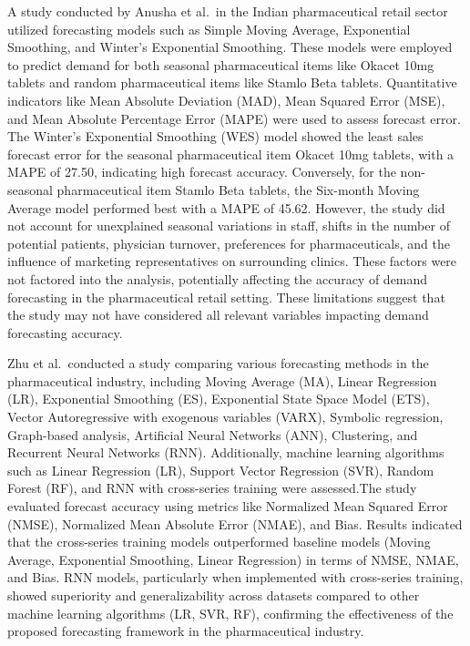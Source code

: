 \documentclass[
  authoryear,
  preprint,
  3p]{elsarticle}
\begin{document}
A study conducted by Anusha et al.~in the Indian pharmaceutical retail
sector utilized forecasting models such as Simple Moving Average,
Exponential Smoothing, and Winter's Exponential
Smoothing\citep{anusha2014demand}. These models were employed to predict
demand for both seasonal pharmaceutical items like Okacet 10mg tablets
and random pharmaceutical items like Stamlo Beta tablets. Quantitative
indicators like Mean Absolute Deviation (MAD), Mean Squared Error (MSE),
and Mean Absolute Percentage Error (MAPE) were used to assess forecast
error. The Winter's Exponential Smoothing (WES) model showed the least
sales forecast error for the seasonal pharmaceutical item Okacet 10mg
tablets, with a MAPE of 27.50, indicating high forecast accuracy.
Conversely, for the non-seasonal pharmaceutical item Stamlo Beta
tablets, the Six-month Moving Average model performed best with a MAPE
of 45.62\citep{anusha2014demand}. However, the study did not account for
unexplained seasonal variations in staff, shifts in the number of
potential patients, physician turnover, preferences for pharmaceuticals,
and the influence of marketing representatives on surrounding clinics.
These factors were not factored into the analysis, potentially affecting
the accuracy of demand forecasting in the pharmaceutical retail setting.
These limitations suggest that the study may not have considered all
relevant variables impacting demand forecasting accuracy.

Zhu et al.~conducted a study comparing various forecasting methods in
the pharmaceutical industry, including Moving Average (MA), Linear
Regression (LR), Exponential Smoothing (ES), Exponential State Space
Model (ETS), Vector Autoregressive with exogenous variables (VARX),
Symbolic regression, Graph-based analysis, Artificial Neural Networks
(ANN), Clustering, and Recurrent Neural Networks
(RNN)\citep{zhu2021demand}. Additionally, machine learning algorithms
such as Linear Regression (LR), Support Vector Regression (SVR), Random
Forest (RF), and RNN with cross-series training were assessed.The study
evaluated forecast accuracy using metrics like Normalized Mean Squared
Error (NMSE), Normalized Mean Absolute Error (NMAE), and Bias. Results
indicated that the cross-series training models outperformed baseline
models (Moving Average, Exponential Smoothing, Linear Regression) in
terms of NMSE, NMAE, and Bias. RNN models, particularly when implemented
with cross-series training, showed superiority and generalizability
across datasets compared to other machine learning algorithms (LR, SVR,
RF), confirming the effectiveness of the proposed forecasting framework
in the pharmaceutical industry.
\end{document}
